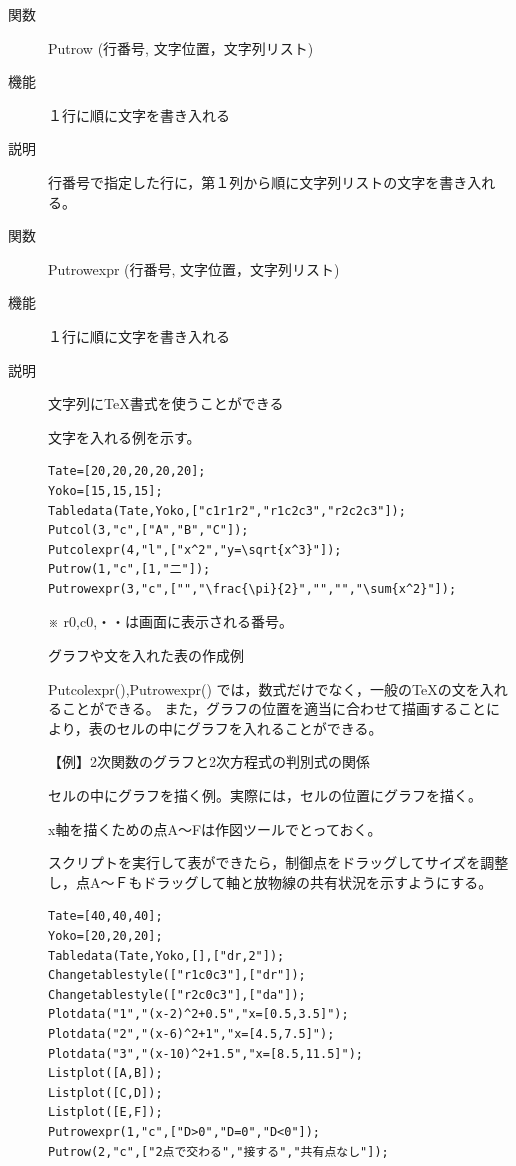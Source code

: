 \documentclass[papersize,a4paper,10pt,uplatex]{jsarticle}
\begin{document}
\begin{description}
\vspace{\baselineskip}
\hypertarget{putrow}{}
\item[関数]Putrow (行番号, 文字位置，文字列リスト)
\item[機能]１行に順に文字を書き入れる
\item[説明]行番号で指定した行に，第１列から順に文字列リストの文字を書き入れる。


\vspace{\baselineskip}
\hypertarget{putrowexpr}{}
\item[関数]Putrowexpr (行番号, 文字位置，文字列リスト)
\item[機能]１行に順に文字を書き入れる
\item[説明]文字列に\TeX 書式を使うことができる

文字を入れる例を示す。
\begin{verbatim}
Tate=[20,20,20,20,20];
Yoko=[15,15,15];
Tabledata(Tate,Yoko,["c1r1r2","r1c2c3","r2c2c3"]);
Putcol(3,"c",["A","B","C"]);
Putcolexpr(4,"l",["x^2","y=\sqrt{x^3}"]);
Putrow(1,"c",[1,"二"]);
Putrowexpr(3,"c",["","\frac{\pi}{2}","","","\sum{x^2}"]);
\end{verbatim}
 \vspace{\baselineskip}
\begin{center}  \end{center}

※ r0,c0,・・は画面に表示される番号。

グラフや文を入れた表の作成例

Putcolexpr(),Putrowexpr() では，数式だけでなく，一般の\TeX の文を入れることができる。
また，グラフの位置を適当に合わせて描画することにより，表のセルの中にグラフを入れることができる。

\vspace{\baselineskip}
【例】2次関数のグラフと2次方程式の判別式の関係

セルの中にグラフを描く例。実際には，セルの位置にグラフを描く。

x軸を描くための点A〜Fは作図ツールでとっておく。

スクリプトを実行して表ができたら，制御点をドラッグしてサイズを調整し，点A〜Ｆもドラッグして軸と放物線の共有状況を示すようにする。

\vspace{\baselineskip}
\begin{verbatim}
Tate=[40,40,40];
Yoko=[20,20,20];
Tabledata(Tate,Yoko,[],["dr,2"]);
Changetablestyle(["r1c0c3"],["dr"]);
Changetablestyle(["r2c0c3"],["da"]);
Plotdata("1","(x-2)^2+0.5","x=[0.5,3.5]");
Plotdata("2","(x-6)^2+1","x=[4.5,7.5]");
Plotdata("3","(x-10)^2+1.5","x=[8.5,11.5]");
Listplot([A,B]);
Listplot([C,D]);
Listplot([E,F]);
Putrowexpr(1,"c",["D>0","D=0","D<0"]);
Putrow(2,"c",["2点で交わる","接する","共有点なし"]);
\end{verbatim}


\end{description}
\end{document}
